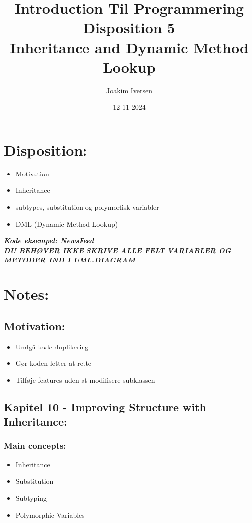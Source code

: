 \documentclass[a4paper,12pt]{article}
\title{Introduction Til Programmering \\
        Disposition 5 \\
        Inheritance and Dynamic Method Lookup}
\author{Joakim Iversen}
\date{12-11-2024}
\newcommand{\textbfit}[1]{\textbf{\textit{#1}}}
\begin{document}
    \maketitle
\newpage

\section*{Disposition:}
\begin{itemize}
    \item Motivation
    \item Inheritance
    \item subtypes, substitution og polymorfisk variabler
    \item DML (Dynamic Method Lookup)
\end{itemize}

\newpage
\begin{center}
    \textbfit{Kode eksempel: NewsFeed}\\
    
    \textbfit{DU BEHØVER IKKE SKRIVE ALLE FELT VARIABLER OG METODER IND I UML-DIAGRAM}
\end{center}

\section*{Notes:}
\subsection*{Motivation:}

\begin{itemize}
    \item Undgå kode duplikering
    \item Gør koden letter at rette
    \item Tilføje features uden at modifisere subklassen
\end{itemize}

\subsection*{Kapitel 10 - Improving Structure with Inheritance:}
\subsubsection*{Main concepts:}
\begin{itemize}
    \item Inheritance
    \item Substitution
    \item Subtyping
    \item Polymorphic Variables
\end{itemize}
\end{document}
